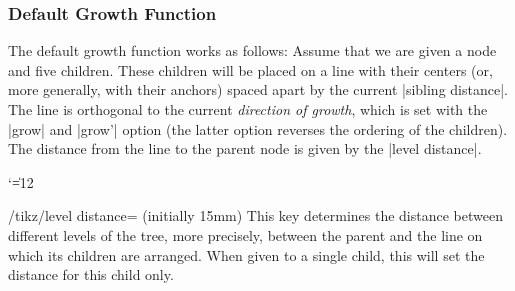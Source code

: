 \subsubsection{Default Growth Function}

The default growth function works as follows: Assume that we are given a node
and five children. These children will be placed on a line with their centers
(or, more generally, with their anchors) spaced apart by the current
|sibling distance|. The line is orthogonal to the current \emph{direction of
growth}, which is set with the |grow| and |grow'| option (the latter option
reverses the ordering of the children). The distance from the line to the
parent node is given by the |level distance|.
%
{\catcode`\|=12
\begin{codeexample}[]
\end{codeexample}
}

\begin{key}{/tikz/level distance= (initially 15mm)}
    This key determines the distance between different levels of the tree, more
    precisely, between the parent and the line on which its children are
    arranged. When given to a single child, this will set the distance for this
    child only.
\begin{codeexample}[]
\end{codeexample}

\begin{codeexample}[]
\end{codeexample}
\end{key}

